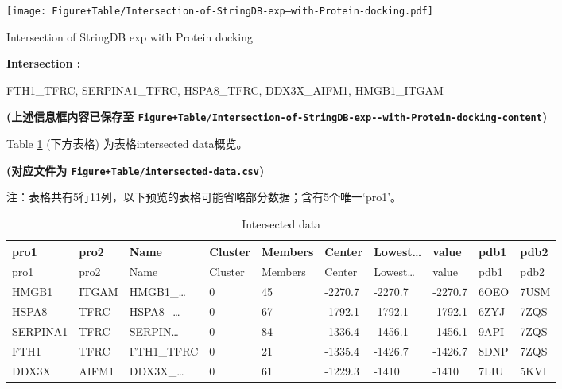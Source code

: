 \documentclass[
]{article}
\begin{document}
\def\@captype{figure}
\begin{center}
\texttt{[image: Figure+Table/Intersection-of-StringDB-exp--with-Protein-docking.pdf]}
\caption{Intersection of StringDB exp  with Protein docking}\label{fig:Intersection-of-StringDB-exp--with-Protein-docking}
\end{center}
\begin{center}\begin{tcolorbox}[colback=gray!10, colframe=gray!50, width=0.9\linewidth, arc=1mm, boxrule=0.5pt]
\textbf{
Intersection
:}

\vspace{0.5em}

    FTH1\_TFRC, SERPINA1\_TFRC, HSPA8\_TFRC, DDX3X\_AIFM1,
HMGB1\_ITGAM

\vspace{2em}
\end{tcolorbox}
\end{center}

\textbf{(上述信息框内容已保存至 \texttt{Figure+Table/Intersection-of-StringDB-exp-\/-with-Protein-docking-content})}

Table \ref{tab:intersected-data} (下方表格) 为表格intersected data概览。

\textbf{(对应文件为 \texttt{Figure+Table/intersected-data.csv})}

\begin{center}\begin{tcolorbox}[colback=gray!10, colframe=gray!50, width=0.9\linewidth, arc=1mm, boxrule=0.5pt]注：表格共有5行11列，以下预览的表格可能省略部分数据；含有5个唯一`pro1'。
\end{tcolorbox}
\end{center}

\begin{longtable}[]{@{}llllllllll@{}}
\caption{\label{tab:intersected-data}Intersected data}\tabularnewline
\toprule
pro1 & pro2 & Name & Cluster & Members & Center & Lowest\ldots{} & value & pdb1 & pdb2\tabularnewline
\midrule
\endfirsthead
\toprule
pro1 & pro2 & Name & Cluster & Members & Center & Lowest\ldots{} & value & pdb1 & pdb2\tabularnewline
\midrule
\endhead
HMGB1 & ITGAM & HMGB1\_\ldots{} & 0 & 45 & -2270.7 & -2270.7 & -2270.7 & 6OEO & 7USM\tabularnewline
HSPA8 & TFRC & HSPA8\_\ldots{} & 0 & 67 & -1792.1 & -1792.1 & -1792.1 & 6ZYJ & 7ZQS\tabularnewline
SERPINA1 & TFRC & SERPIN\ldots{} & 0 & 84 & -1336.4 & -1456.1 & -1456.1 & 9API & 7ZQS\tabularnewline
FTH1 & TFRC & FTH1\_TFRC & 0 & 21 & -1335.4 & -1426.7 & -1426.7 & 8DNP & 7ZQS\tabularnewline
DDX3X & AIFM1 & DDX3X\_\ldots{} & 0 & 61 & -1229.3 & -1410 & -1410 & 7LIU & 5KVI\tabularnewline
\bottomrule
\end{longtable}
\end{document}
